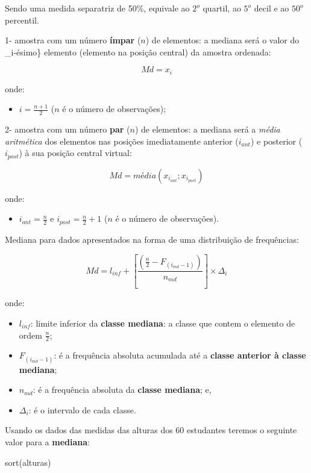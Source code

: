 \documentclass[
]{book}
\newenvironment{Shaded}{\begin{snugshade}}{\end{snugshade}}
\newcommand{\FunctionTok}[1]{\textcolor[rgb]{0.00,0.00,0.00}{#1}}
\newcommand{\NormalTok}[1]{#1}
\providecommand{\tightlist}{%
  \setlength{\itemsep}{0pt}\setlength{\parskip}{0pt}}
\begin{document}
Sendo uma medida separatriz de 50\%, equivale ao \(2^{o}\) quartil, ao \(5^{o}\) decil e ao \(50^{o}\) percentil.

1- amostra com um número \textbf{ímpar} (\(n\)) de elementos: a mediana será o valor do \_i-ésimo\} elemento (elemento na posição central) da amostra ordenada:

\[
Md=x_{i} 
\]

onde:

\begin{itemize}
\tightlist
\item
  \(i=\frac{n+1}{2}\) (\(n\) é o número de observações);
\end{itemize}

2- amostra com um número \textbf{par} (\(n\)) de elementos: a mediana será a \emph{média aritmética} dos elementos nas posições imediatamente anterior (\(i_{ant}\)) e posterior (\(i_{post}\)) à sua posição central virtual:

\[
Md=média(x_{i_{ant}} ; x_{i_{post}})
\]

onde:

\begin{itemize}
\tightlist
\item
  \(i_{ant} = \frac{n}{2}\) e \(i_{post} =\frac{n}{2}+1\) (\(n\) é o número de observações).
\end{itemize}

Mediana para dados apresentados na forma de uma distribuição de frequências:

\[
Md = l_{inf} + [ \frac{(\frac{n}{2} -  F_{(i_{md}-1)})}{n_{md}} ]\times \Delta_{i}
\]

onde:

\begin{itemize}
\tightlist
\item
  \(l_{inf}\): limite inferior da \textbf{classe mediana}: a classe que contem o elemento de ordem \(\frac{n}{2}\);
\item
  \(F_{(i_{md}-1)}\): é a frequência absoluta acumulada até a \textbf{classe anterior à classe mediana};
\item
  \(n_{md}\): é a frequência absoluta da \textbf{classe mediana}; e,
\item
  \(\Delta_{i}\): é o intervalo de cada classe.
\end{itemize}

Usando os dados das medidas das alturas dos 60 estudantes teremos o seguinte valor para a \textbf{mediana}:

\begin{Shaded}
\begin{Highlighting}[]
\FunctionTok{sort}\NormalTok{(alturas)}
\end{Highlighting}
\end{Shaded}
\end{document}
